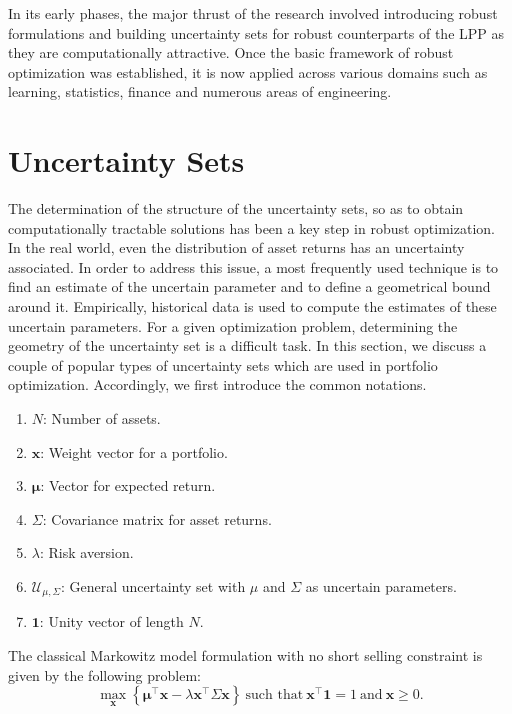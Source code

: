 In its early phases, the major thrust of the research involved introducing robust formulations and building uncertainty sets for robust counterparts of the LPP as they are computationally attractive. Once the basic framework of robust optimization was established, it is now applied across various domains such as learning, statistics, finance and numerous areas of engineering.

\section{Uncertainty Sets}

The determination of the structure of the uncertainty sets, so as to obtain computationally tractable solutions has been a key step in robust optimization. In the real world, even the distribution of asset returns has an uncertainty associated. In order to address this issue, a most frequently used technique is to find an estimate of the uncertain parameter and to define a geometrical bound around it. Empirically, historical data is used to compute the estimates of these uncertain parameters. For a given optimization problem, determining the geometry of the uncertainty set is a difficult task. In this section, we discuss a couple of popular types of uncertainty sets which are used in portfolio optimization. Accordingly, we first introduce the common notations.
\begin{enumerate}
\item $N$: Number of assets.
\item $\displaystyle{\mathbf{x}}$: Weight vector for a portfolio.
\item $\displaystyle{\boldsymbol{\mu}}$: Vector for expected return.
\item $\displaystyle{\Sigma}$: Covariance matrix for asset returns.
\item $\lambda$: Risk aversion.
\item $\displaystyle{\mathcal{U}_{\mu,\Sigma}}$: General uncertainty set with $\mu$ and $\Sigma$ as uncertain parameters.
\item $\displaystyle{\mathbf{1}}$: Unity vector of length $N$.
\end{enumerate}
The classical Markowitz model formulation with no short selling constraint is given by the following problem:
\begin{equation}
\label{eq:classical_markowitz}
\max\limits_{\mathbf{x}}\left\{\boldsymbol{\mu}^{\top}\mathbf{x}-\lambda\mathbf{x^{\top}}\Sigma\mathbf{x}\right\}~\text{such that}~
\mathbf{x^{\top}}\mathbf{1}=1~\text{and}~\mathbf{x}\geq 0.
\end{equation}
